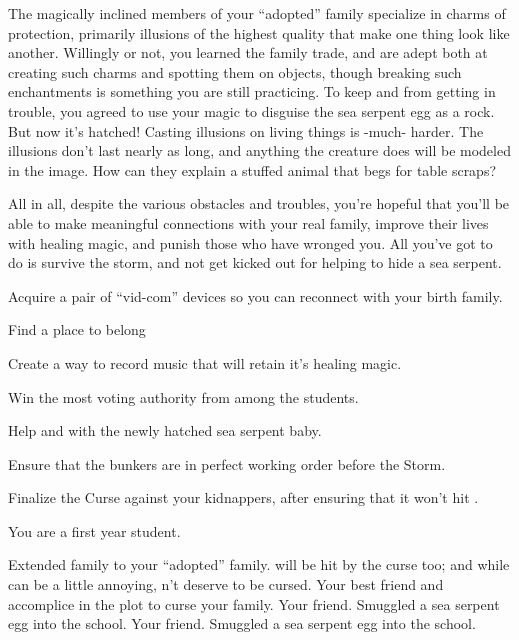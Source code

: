\documentclass[char]{GL2020}
\begin{document}
The magically inclined members of your ``adopted'' family specialize in charms of protection, primarily illusions of the highest quality that make one thing look like another. Willingly or not, you learned the family trade, and are adept both at creating such charms and spotting them on objects, though breaking such enchantments is something you are still practicing.  To keep \cDisney{} and \cPirateChild{} from getting in trouble, you agreed to use your magic to disguise the sea serpent egg as a rock. But now it's hatched!  Casting illusions on living things is -much- harder. The illusions don't last nearly as long, and anything the creature does will be modeled in the image. How can they explain a stuffed animal that begs for table scraps?

All in all, despite the various obstacles and troubles, you’re hopeful that you’ll be able to make meaningful connections with your real family, improve their lives with healing magic, and punish those who have wronged you.  All you’ve got to do is survive the storm, and not get kicked out for helping to hide a sea serpent.

\begin{itemz}[Goals]
	\item Acquire a pair of ``vid-com'' devices so you can reconnect with your birth family.
	\item Find a place to belong
	\item Create a way to record music that will retain it's healing magic.
	\item Win the most voting authority from among the \pFarmers{} students.
	\item Help \cPirateChild{} and \cDisney{} with the newly hatched sea serpent baby.
	\item Ensure that the bunkers are in perfect working order before the Storm.
	\item Finalize the Curse against your kidnappers, after ensuring that it won't hit \cMusic{}.
\end{itemz}

\begin{itemz}[Notes]
	\item You are a first year student.
\end{itemz}

\begin{contacts}
	\contact{\cMusic{}} Extended family to your ``adopted'' family. \cMusic{\They} will be hit  by the curse too; and while \cMusic{} can be a little annoying, \cMusic{} \cMusic{\does}n’t deserve to be cursed.
	\contact{\cLibAssist{}} Your best friend and accomplice in the plot to curse your family.
	\contact{\cPirateChild{}} Your friend. Smuggled a sea serpent egg into the school.
	\contact{\cDisney{}} Your friend. Smuggled a sea serpent egg into the school.
\end{contacts}
\end{document}
